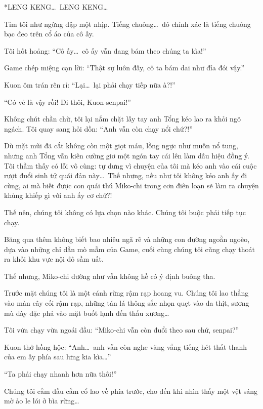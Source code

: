\documentclass[../main.tex]{subfiles}
\begin{document}
*LENG KENG\dots\ LENG KENG\dots*

Tim tôi như ngừng đập một nhịp. Tiếng chuông\dots\ đó chính xác là tiếng chuông bạc đeo trên cổ áo của cô ấy.

Tôi hốt hoảng: ``Cô ấy\dots\ cô ấy vẫn đang bám theo chúng ta kìa!''

Game chép miệng cạn lời: ``Thật sự luôn đấy, cô ta bám dai như đỉa đói vậy.''

Kuon ôm trán rên rỉ: ``Lại\dots\ lại phải chạy tiếp nữa à?!''

``Có vẻ là vậy rồi! Đi thôi, Kuon-senpai!''

Không chút chần chừ, tôi lại nắm chặt lấy tay anh Tổng kéo lao ra khỏi ngõ ngách. Tôi quay sang hỏi dồn: ``Anh vẫn còn chạy nổi chứ?!''

Dù mặt mũi đã cắt không còn một giọt máu, lồng ngực như muốn nổ tung, nhưng anh Tổng vẫn kiên cường giơ một ngón tay cái lên làm dấu hiệu đồng ý. Tôi thầm thấy có lỗi vô cùng: tự dưng vì chuyện của tôi mà kéo anh vào cái cuộc rượt đuổi sinh tử quái đản này\dots\ Thế nhưng, nếu như tôi không kéo anh ấy đi cùng, ai mà biết được con quái thú Miko-chi trong cơn điên loạn sẽ làm ra chuyện khủng khiếp gì với anh ấy cơ chứ?!

Thế nên, chúng tôi không có lựa chọn nào khác. Chúng tôi buộc phải tiếp tục chạy.

\ct

Băng qua thêm không biết bao nhiêu ngã rẽ và những con đường ngoằn ngoèo, dựa vào những chỉ dẫn mò mẫm của Game, cuối cùng chúng tôi cũng chạy thoát ra khỏi khu vực nội đô sầm uất.


Thế nhưng, Miko-chi dường như vẫn không hề có ý định buông tha.

Trước mặt chúng tôi là một cánh rừng rậm rạp hoang vu. Chúng tôi lao thẳng vào màn cây cối rậm rạp, những tán lá thông sắc nhọn quẹt vào da thịt, sương mù dày đặc phả vào mặt buốt lạnh đến thấu xương\dots


Tôi vừa chạy vừa ngoái đầu: ``Miko-chi vẫn còn đuổi theo sau chứ, senpai?''

Kuon thở hồng hộc: ``Anh\dots\ anh vẫn còn nghe văng vẳng tiếng hét thất thanh của em ấy phía sau lưng kia kìa\dots''

``Ta phải chạy nhanh hơn nữa thôi!''

Chúng tôi cắm đầu cắm cổ lao về phía trước, cho đến khi nhìn thấy một vệt sáng mờ ảo le lói ở bìa rừng\dots
\end{document}
